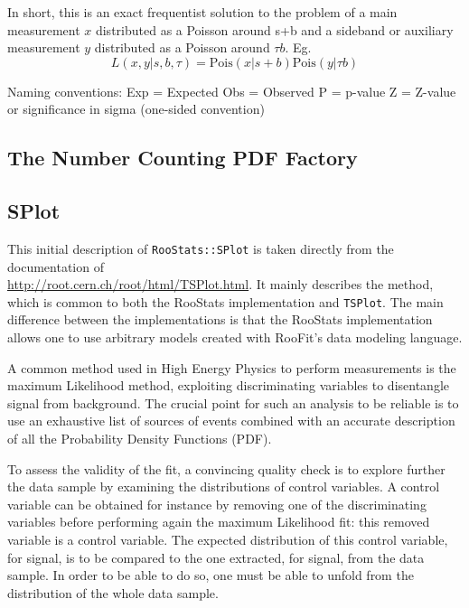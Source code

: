 \documentclass[11pt]{article}
\begin{document}
In short, this is an exact frequentist solution to the problem of
a main measurement $x$ distributed as a Poisson around s+b and a sideband or 
auxiliary measurement $y$ distributed as a Poisson around $\tau b$.  Eg. 
\[
L(x,y|s,b,\tau) = \textrm{Pois}(x|s+b) \textrm{Pois}(y|\tau b)
\]

Naming conventions:
Exp = Expected
Obs = Observed
P   = p-value
Z   = Z-value or significance in sigma (one-sided convention)




\subsection{The Number Counting PDF Factory}

	\subsection{SPlot}

This initial description of \texttt{RooStats::SPlot} is taken directly from the documentation of\\ \url{http://root.cern.ch/root/html/TSPlot.html}.  It mainly describes the method, which is common to both the RooStats implementation and \texttt{TSPlot}.  The main difference between the implementations is that the RooStats implementation allows one to use arbitrary models created with RooFit's data modeling language.

A common method used in High Energy Physics to perform measurements is
the maximum Likelihood method, exploiting discriminating variables to
disentangle signal from background. The crucial point for such an
analysis to be reliable is to use an exhaustive list of sources of
events combined with an accurate description of all the Probability
Density Functions (PDF).


To assess the validity of the fit, a convincing quality check
is to explore further the data sample by examining the distributions of
control variables. A control variable can be obtained for instance by
removing one of the discriminating variables before performing again
the maximum Likelihood fit: this removed variable is a control
variable. The expected distribution of this control variable, for
signal, is to be compared to the one extracted, for signal, from the
data sample. In order to be able to do so, one must be able to unfold
from the distribution of the whole data sample.
\end{document}
